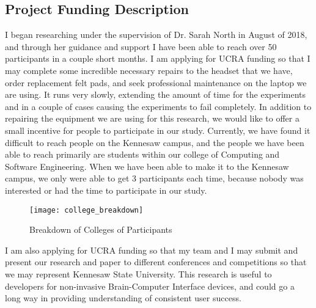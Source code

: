 \documentclass{article}
\begin{document}
\subsection*{Project Funding Description}
I began researching under the supervision of Dr. Sarah North in August of 2018, and through her guidance and support I have been able to reach over 50 participants in a couple short months. 
\newline \newline
I am applying for UCRA funding so that I may complete some incredible necessary repairs to the headset that we have, order replacement felt pads, and seek professional maintenance on the laptop we are using. It runs very slowly, extending the amount of time for the experiments and in a couple of cases causing the experiments to fail completely. 
\newline \newline
In addition to repairing the equipment we are using for this research, we would like to offer a small incentive for people to participate in our study. Currently, we have found it difficult to reach people on the Kennesaw campus, and the people we have been able to reach primarily are students within our college of Computing and Software Engineering. When we have been able to make it to the Kennesaw campus, we only were able to get 3 participants each time, because nobody was interested or had the time to participate in our study.

\begin{figure}[H]
    \centering
    \texttt{[image: college\_breakdown]}
    \caption{Breakdown of Colleges of Participants}
    \label{fig:my_label}
\end{figure}

I am also applying for UCRA funding so that my team and I may submit and present our research and paper to different conferences and competitions so that we may represent Kennesaw State University. This research is useful to developers for non-invasive Brain-Computer Interface devices, and could go a long way in providing understanding of consistent user success.
\end{document}
